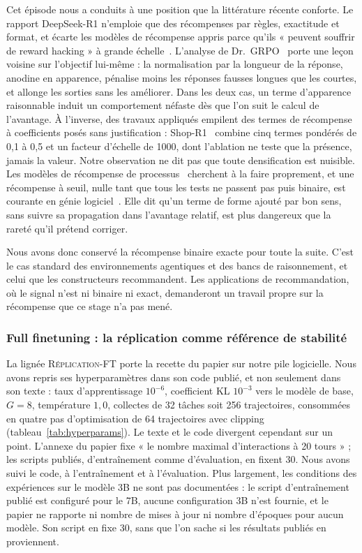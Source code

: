 \documentclass[11pt,a4paper]{article}
\begin{document}
Cet épisode nous a conduits à une position que la littérature récente conforte. Le rapport DeepSeek-R1 n'emploie que des récompenses par règles, exactitude et format, et écarte les modèles de récompense appris parce qu'ils « peuvent souffrir de reward hacking » à grande échelle~\cite{deepseekr1_2025}. L'analyse de Dr.~GRPO~\cite{liu2025drgrpo} porte une leçon voisine sur l'objectif lui-même : la normalisation par la longueur de la réponse, anodine en apparence, pénalise moins les réponses fausses longues que les courtes, et allonge les sorties sans les améliorer. Dans les deux cas, un terme d'apparence raisonnable induit un comportement néfaste dès que l'on suit le calcul de l'avantage. À l'inverse, des travaux appliqués empilent des termes de récompense à coefficients posés sans justification : Shop-R1~\cite{shopr1_2026} combine cinq termes pondérés de 0{,}1 à 0{,}5 et un facteur d'échelle de 1000, dont l'ablation ne teste que la présence, jamais la valeur. Notre observation ne dit pas que toute densification est nuisible. Les modèles de récompense de processus~\cite{lightman2023verify} cherchent à la faire proprement, et une récompense à seuil, nulle tant que tous les tests ne passent pas puis binaire, est courante en génie logiciel~\cite{song2026swemaster}. Elle dit qu'un terme de forme ajouté par bon sens, sans suivre sa propagation dans l'avantage relatif, est plus dangereux que la rareté qu'il prétend corriger.

Nous avons donc conservé la récompense binaire exacte pour toute la suite. C'est le cas standard des environnements agentiques et des bancs de raisonnement, et celui que les constructeurs recommandent. Les applications de recommandation, où le signal n'est ni binaire ni exact, demanderont un travail propre sur la récompense que ce stage n'a pas mené.






\subsubsection{Full finetuning : la réplication comme référence de stabilité}

La lignée \textsc{Réplication-FT} porte la recette du papier sur notre pile logicielle. Nous avons repris ses hyperparamètres dans son code publié, et non seulement dans son texte : taux d'apprentissage $10^{-6}$, coefficient KL $10^{-3}$ vers le modèle de base, $G=8$, température $1{,}0$, collectes de 32 tâches soit 256 trajectoires, consommées en quatre pas d'optimisation de 64 trajectoires avec clipping (tableau~\ref{tab:hyperparams}). Le texte et le code divergent cependant sur un point. L'annexe du papier fixe « le nombre maximal d'interactions à 20 tours » ; les scripts publiés, d'entraînement comme d'évaluation, en fixent 30. Nous avons suivi le code, à l'entraînement et à l'évaluation. Plus largement, les conditions des expériences sur le modèle 3B ne sont pas documentées : le script d'entraînement publié est configuré pour le 7B, aucune configuration 3B n'est fournie, et le papier ne rapporte ni nombre de mises à jour ni nombre d'époques pour aucun modèle. Son script en fixe 30, sans que l'on sache si les résultats publiés en proviennent.
\end{document}
